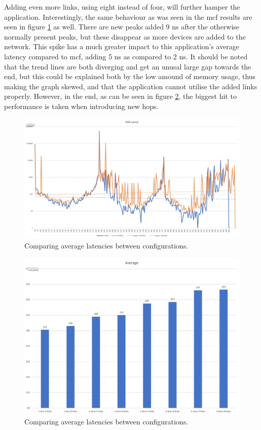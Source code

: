 Adding even more links, using eight instead of four, will further hamper the application. Interestingly, the same behaviour as was seen in the mcf results are seen in figure \ref{Memory-access-444-links-compare} as well. There are new peaks added 9 ns after the otherwise normally present peaks, but these disappear as more devices are added to the network. This spike has a much greater impact to this application's average latency compared to mcf, adding 5 ns as compared to 2 ns. It should be noted that the trend lines are both diverging and get an unusal large gap towards the end, but this could be explained both by the low amound of memory usage, thus making the graph skewed, and that the application cannot utilise the added links properly. However, in the end, as can be seen in figure \ref{Memory-access-444-average-latency}, the biggest hit to performance is taken when introducing new hops. 

\begin{figure}[!ht]
    \centering
    \includegraphics[width=0.75\linewidth]{figure/444-2_4-8.jpg}
    \caption{Comparing average latencies between configurations.}
    \label{Memory-access-444-links-compare}
\end{figure}
\begin{figure}[!ht]
    \centering
    \includegraphics[width=0.75\linewidth]{figure/444_averages.jpg}
    \caption{Comparing average latencies between configurations.}
    \label{Memory-access-444-average-latency}
\end{figure}

